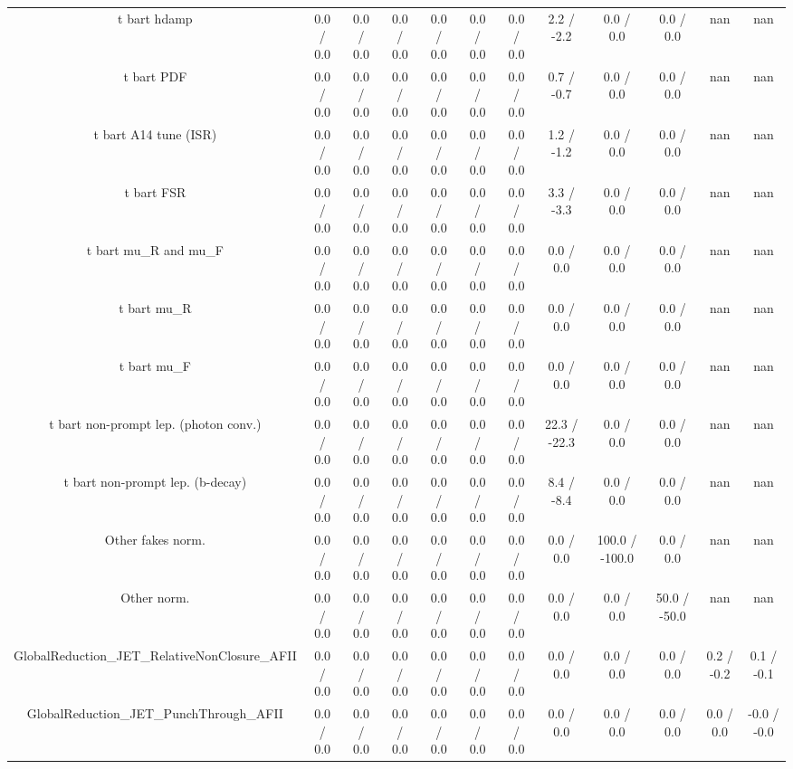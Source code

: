 \begin{table}[htbp]
\begin{center}
\begin{tabular}{|c|c|c|c|c|c|c|c|c|c|c|c|}
  t bar{t} hdamp & 0.0 / 0.0 & 0.0 / 0.0 & 0.0 / 0.0 & 0.0 / 0.0 & 0.0 / 0.0 & 0.0 / 0.0 & 2.2 / -2.2 & 0.0 / 0.0 & 0.0 / 0.0 &    nan    &    nan    \\ 
  t bar{t} PDF & 0.0 / 0.0 & 0.0 / 0.0 & 0.0 / 0.0 & 0.0 / 0.0 & 0.0 / 0.0 & 0.0 / 0.0 & 0.7 / -0.7 & 0.0 / 0.0 & 0.0 / 0.0 &    nan    &    nan    \\ 
  t bar{t} A14 tune (ISR) & 0.0 / 0.0 & 0.0 / 0.0 & 0.0 / 0.0 & 0.0 / 0.0 & 0.0 / 0.0 & 0.0 / 0.0 & 1.2 / -1.2 & 0.0 / 0.0 & 0.0 / 0.0 &    nan    &    nan    \\ 
  t bar{t} FSR & 0.0 / 0.0 & 0.0 / 0.0 & 0.0 / 0.0 & 0.0 / 0.0 & 0.0 / 0.0 & 0.0 / 0.0 & 3.3 / -3.3 & 0.0 / 0.0 & 0.0 / 0.0 &    nan    &    nan    \\ 
  t bar{t}  mu_{R} and  mu_{F} & 0.0 / 0.0 & 0.0 / 0.0 & 0.0 / 0.0 & 0.0 / 0.0 & 0.0 / 0.0 & 0.0 / 0.0 & 0.0 / 0.0 & 0.0 / 0.0 & 0.0 / 0.0 &    nan    &    nan    \\ 
  t bar{t}  mu_{R} & 0.0 / 0.0 & 0.0 / 0.0 & 0.0 / 0.0 & 0.0 / 0.0 & 0.0 / 0.0 & 0.0 / 0.0 & 0.0 / 0.0 & 0.0 / 0.0 & 0.0 / 0.0 &    nan    &    nan    \\ 
  t bar{t}  mu_{F} & 0.0 / 0.0 & 0.0 / 0.0 & 0.0 / 0.0 & 0.0 / 0.0 & 0.0 / 0.0 & 0.0 / 0.0 & 0.0 / 0.0 & 0.0 / 0.0 & 0.0 / 0.0 &    nan    &    nan    \\ 
  t bar{t} non-prompt lep. (photon conv.) & 0.0 / 0.0 & 0.0 / 0.0 & 0.0 / 0.0 & 0.0 / 0.0 & 0.0 / 0.0 & 0.0 / 0.0 & 22.3 / -22.3 & 0.0 / 0.0 & 0.0 / 0.0 &    nan    &    nan    \\ 
  t bar{t} non-prompt lep. (b-decay) & 0.0 / 0.0 & 0.0 / 0.0 & 0.0 / 0.0 & 0.0 / 0.0 & 0.0 / 0.0 & 0.0 / 0.0 & 8.4 / -8.4 & 0.0 / 0.0 & 0.0 / 0.0 &    nan    &    nan    \\ 
  Other fakes norm. & 0.0 / 0.0 & 0.0 / 0.0 & 0.0 / 0.0 & 0.0 / 0.0 & 0.0 / 0.0 & 0.0 / 0.0 & 0.0 / 0.0 & 100.0 / -100.0 & 0.0 / 0.0 &    nan    &    nan    \\ 
  Other norm. & 0.0 / 0.0 & 0.0 / 0.0 & 0.0 / 0.0 & 0.0 / 0.0 & 0.0 / 0.0 & 0.0 / 0.0 & 0.0 / 0.0 & 0.0 / 0.0 & 50.0 / -50.0 &    nan    &    nan    \\ 
  GlobalReduction_JET_RelativeNonClosure_AFII & 0.0 / 0.0 & 0.0 / 0.0 & 0.0 / 0.0 & 0.0 / 0.0 & 0.0 / 0.0 & 0.0 / 0.0 & 0.0 / 0.0 & 0.0 / 0.0 & 0.0 / 0.0 & 0.2 / -0.2 & 0.1 / -0.1 \\ 
  GlobalReduction_JET_PunchThrough_AFII & 0.0 / 0.0 & 0.0 / 0.0 & 0.0 / 0.0 & 0.0 / 0.0 & 0.0 / 0.0 & 0.0 / 0.0 & 0.0 / 0.0 & 0.0 / 0.0 & 0.0 / 0.0 & 0.0 / 0.0 & -0.0 / -0.0 \\ 

\end{tabular}
\end{center}
\end{table}

